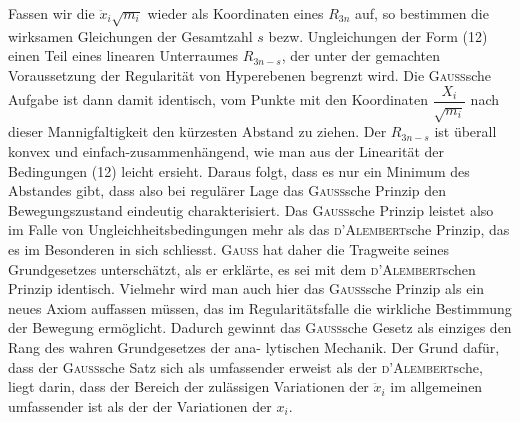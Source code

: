 Fassen wir die $\ddot x_i\sqrt{m_i}$ wieder als Koordinaten eines $R_{3n}$ auf, so bestimmen
die wirksamen Gleichungen der Gesamtzahl $s$ bezw. Ungleichungen der
Form (12) einen Teil eines linearen Unterraumes $R_{3n-s}$, der unter der gemachten
Voraussetzung der Regularität von Hyperebenen begrenzt wird. Die
\textsc{Gauss}sche Aufgabe ist dann damit identisch, vom Punkte mit den Koordinaten
$\dfrac{X_i}{\sqrt{m_i}}$ nach dieser Mannigfaltigkeit den kürzesten Abstand zu ziehen. Der
$R_{3n-s}$ ist überall konvex und einfach-zusammenhängend, wie man aus der
Linearität der Bedingungen (12) leicht ersieht. Daraus folgt, dass es nur ein
Minimum des Abstandes gibt, dass also bei regulärer Lage das \textsc{Gauss}sche
Prinzip den Bewegungszustand eindeutig charakterisiert. Das \textsc{Gauss}sche Prinzip
leistet also im Falle von Ungleichheitsbedingungen mehr als das \textsc{d’Alembert}sche
Prinzip, das es im Besonderen in sich schliesst. \textsc{Gauss} hat daher die
Tragweite seines Grundgesetzes unterschätzt, als er erklärte, es sei mit dem
\textsc{d’Alembert}schen Prinzip identisch. Vielmehr wird man auch hier das \textsc{Gauss}sche
Prinzip als ein neues Axiom auffassen müssen, das im Regularitätsfalle
die wirkliche Bestimmung der Bewegung ermöglicht. Dadurch gewinnt das
\textsc{Gauss}sche Gesetz als einziges den Rang des wahren Grundgesetzes der ana\nobreakdash-
\clearpage{}
\noindent lytischen Mechanik. Der Grund dafür, dass der \textsc{Gauss}sche Satz sich als umfassender
erweist als der \textsc{d’Alembert}sche, liegt darin, dass der Bereich der
zulässigen Variationen der $\ddot x_i$ im allgemeinen umfassender ist als der der
Variationen der $x_i$.

